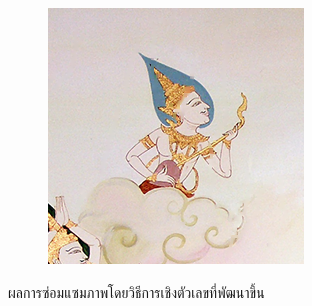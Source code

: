 \begin{figure}[H]
\begin{subfigure}{0.4\linewidth}
        \includegraphics[width=0.8\linewidth]{image/result_ex4/multisplitbergman_case05.png}			
    \end{subfigure}
    \caption{ผลการซ่อมแซมภาพโดยวิธีการเชิงตัวเลขที่พัฒนาขึ้น}
\end{figure}
